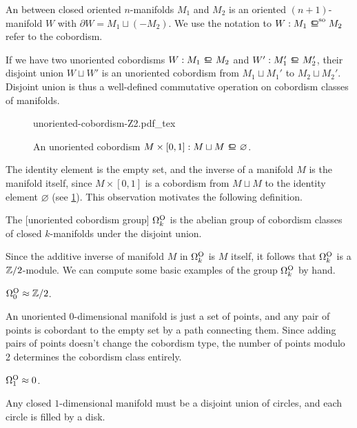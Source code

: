 \begin{definition}
	An  between closed oriented $n$-manifolds $M_1$ and $M_2$ is an oriented $(n+1)$-manifold $W$ with $\partial W = M_1\sqcup (-M_2)$. We use the notation to $W : M_1\sobord M_2$ refer to the cobordism.
\end{definition}

If we have two unoriented cobordisms $W : M_1 \bord M_2$ and $W' : M_1'\bord M_2'$, their disjoint union $W\sqcup W'$ is an unoriented cobordism from $M_1\sqcup M_1'$ to $M_2\sqcup M_2'$. Disjoint union is thus a well-defined commutative operation on cobordism classes of manifolds.
\begin{figure}[ht]
	\centering
	{unoriented-cobordism-Z2.pdf_tex}
	\caption{An unoriented cobordism $M\times [0,1] : M\sqcup M \bord \varnothing$.}\label{fig:unoriented-cobordism-Z2}
\end{figure}
The identity element is the empty set, and the inverse of a manifold $M$ is the manifold itself, since $M\times [0,1]$ is a cobordism from $M\sqcup M$ to the identity element $\varnothing$ (see \cref{fig:unoriented-cobordism-Z2}). This observation motivates the following definition.

\begin{definition}
The [unoriented cobordism group] $\Omega^{\mathrm{O}}_k$ is the abelian group of cobordism classes of closed $k$-manifolds under the disjoint union. 
\end{definition}

Since the additive inverse of manifold $M$ in $\Omega^{\mathrm{O}}_k$ is $M$ itself, it follows that $\Omega_k^{\mathrm{O}}$ is a $\mathbb{Z}/2$-module. We can compute some basic examples of the group $\Omega_k^{\mathrm{O}}$ by hand.

\begin{example}
	$\Omega_0^{\mathrm{O}}\approx \mathbb{Z}/2$. 

	An unoriented 0-dimensional manifold is just a set of points, and any pair of points is cobordant to the empty set by a path connecting them. Since adding pairs of points doesn't change the cobordism type, the number of points modulo 2 determines the cobordism class entirely.
\end{example}

\begin{example}
	$\Omega_1^{\mathrm{O}}\approx 0$.

	Any closed $1$-dimensional manifold must be a disjoint union of circles, and each circle is filled by a disk.
\end{example}

